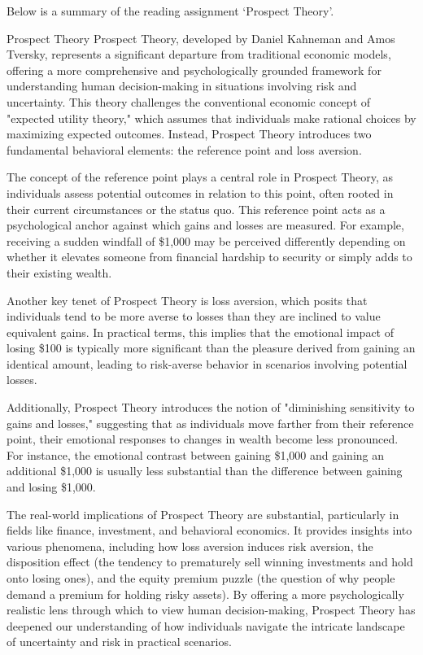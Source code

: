 Below is a summary of the reading assignment `Prospect Theory'.

\begin{notes}{Prospect Theory}
    Prospect Theory, developed by Daniel Kahneman and Amos Tversky, represents a significant departure from traditional economic models, offering a more comprehensive and psychologically grounded framework 
    for understanding human decision-making in situations involving risk and uncertainty. This theory challenges the conventional economic concept of "expected utility theory," which assumes that individuals 
    make rational choices by maximizing expected outcomes. Instead, Prospect Theory introduces two fundamental behavioral elements: the reference point and loss aversion.

    The concept of the reference point plays a central role in Prospect Theory, as individuals assess potential outcomes in relation to this point, often rooted in their current circumstances or the status 
    quo. This reference point acts as a psychological anchor against which gains and losses are measured. For example, receiving a sudden windfall of \$1,000 may be perceived differently depending on whether 
    it elevates someone from financial hardship to security or simply adds to their existing wealth.
    
    Another key tenet of Prospect Theory is loss aversion, which posits that individuals tend to be more averse to losses than they are inclined to value equivalent gains. In practical terms, this implies 
    that the emotional impact of losing \$100 is typically more significant than the pleasure derived from gaining an identical amount, leading to risk-averse behavior in scenarios involving potential losses.
    
    Additionally, Prospect Theory introduces the notion of "diminishing sensitivity to gains and losses," suggesting that as individuals move farther from their reference point, their emotional responses to 
    changes in wealth become less pronounced. For instance, the emotional contrast between gaining \$1,000 and gaining an additional \$1,000 is usually less substantial than the difference between gaining 
    and losing \$1,000.
    
    The real-world implications of Prospect Theory are substantial, particularly in fields like finance, investment, and behavioral economics. It provides insights into various phenomena, including how loss 
    aversion induces risk aversion, the disposition effect (the tendency to prematurely sell winning investments and hold onto losing ones), and the equity premium puzzle (the question of why people demand 
    a premium for holding risky assets). By offering a more psychologically realistic lens through which to view human decision-making, Prospect Theory has deepened our understanding of how individuals 
    navigate the intricate landscape of uncertainty and risk in practical scenarios.
\end{notes}